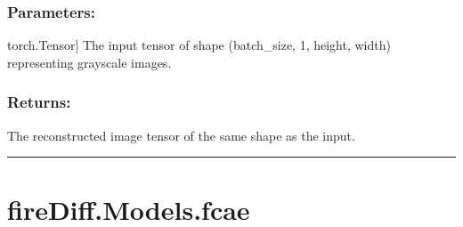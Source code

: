\documentclass[a4paper,10pt,english]{sphinxmanual}
\begin{document}
\begin{fulllineitems}
\begin{fulllineitems}
\subsubsection{Parameters:}
\label{\detokenize{models:id42}}\begin{description}
\sphinxlineitem{x}{[}torch.Tensor{]}
\sphinxAtStartPar
The input tensor of shape (batch\_size, 1, height, width)
representing grayscale images.

\end{description}


\subsubsection{Returns:}
\label{\detokenize{models:id43}}\begin{description}
\sphinxAtStartPar
The reconstructed image tensor of the same shape as the input.

\end{description}

\end{fulllineitems}


\end{fulllineitems}



\bigskip\hrule\bigskip



\section{fireDiff.Models.fcae}
\label{\detokenize{models:module-fireDiff.Models.fcae}}\label{\detokenize{models:firediff-models-fcae}}
\end{document}
